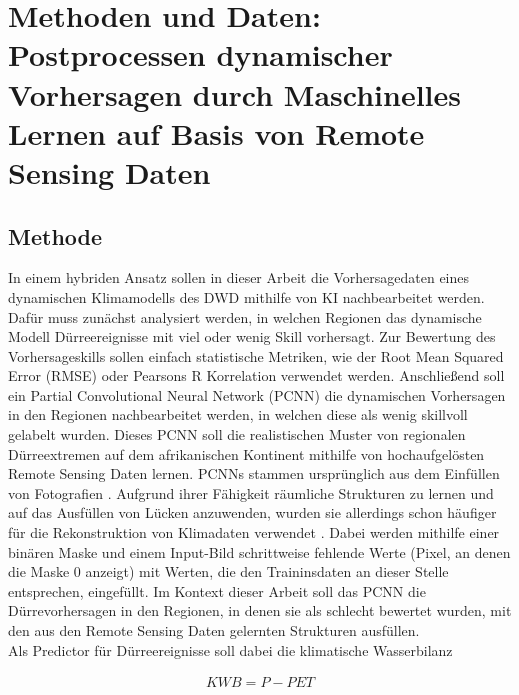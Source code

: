 \documentclass[ba-expose-lentz.tex]{subfile}
\begin{document}
{\let\clearpage\relax \chapter{Methoden und Daten: Postprocessen dynamischer Vorhersagen durch Maschinelles Lernen auf Basis von Remote Sensing Daten}}\label{methoden}

\section{Methode}

In einem hybriden Ansatz sollen in dieser Arbeit die Vorhersagedaten eines dynamischen Klimamodells des DWD mithilfe von KI nachbearbeitet werden.
Dafür muss zunächst analysiert werden, in welchen Regionen das dynamische Modell Dürreereignisse mit viel oder wenig Skill vorhersagt.
Zur Bewertung des Vorhersageskills sollen einfach statistische Metriken, wie der Root Mean Squared Error (RMSE) oder Pearsons R Korrelation verwendet werden.
Anschließend soll ein Partial Convolutional Neural Network (PCNN) die dynamischen Vorhersagen in den Regionen nachbearbeitet werden, in welchen diese als wenig skillvoll gelabelt wurden.
Dieses PCNN soll die realistischen Muster von regionalen Dürreextremen auf dem afrikanischen Kontinent mithilfe von hochaufgelösten Remote Sensing Daten lernen.
PCNNs stammen ursprünglich aus dem Einfüllen von Fotografien \parencite{liu_image_2018}.
Aufgrund ihrer Fähigkeit räumliche Strukturen zu lernen und auf das Ausfüllen von Lücken anzuwenden, wurden sie allerdings schon häufiger für die Rekonstruktion von Klimadaten verwendet \parencite{kadow_artificial_2020, lentz_improving_2025}.
Dabei werden mithilfe einer binären Maske und einem Input-Bild schrittweise fehlende Werte (Pixel, an denen die Maske 0 anzeigt) mit Werten, die den Traininsdaten an dieser Stelle entsprechen, eingefüllt.
Im Kontext dieser Arbeit soll das PCNN die Dürrevorhersagen in den Regionen, in denen sie als schlecht bewertet wurden, mit den aus den Remote Sensing Daten gelernten Strukturen ausfüllen. \\
Als Predictor für Dürreereignisse soll dabei die klimatische Wasserbilanz

\begin{align}
    KWB = P - PET
\end{align}
\end{document}
